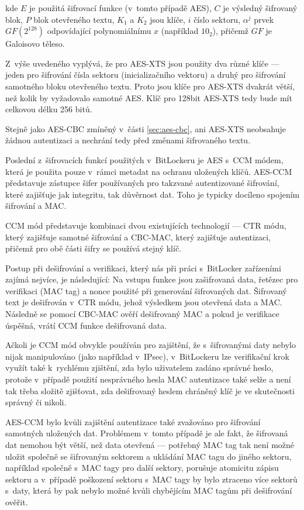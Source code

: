 kde $E$ je použitá šifrovací funkce (v~tomto případě AES), $C$ je výsledný šifrovaný blok, $P$ blok otevřeného textu, $K_1$ a $K_2$ jsou klíče, $i$ číslo sektoru, $\alpha^j$ prvek $GF(2^{128})$ odpovídající polynomiálnímu $x$ (například $10_2$), přičemž $GF$ je Galoisovo těleso.\cite{IEEE2008}

Z~výše uvedeného vyplývá, že pro AES-XTS jsou použity dva různé klíče --- jeden pro šifrování čísla sektoru (inicializačního vektoru) a druhý pro šifrování samotného bloku otevřeného textu. Proto jsou klíče pro AES-XTS dvakrát větší, než kolik by vyžadovalo samotné AES. Klíč pro 128bit AES-XTS tedy bude mít celkovou délku 256 bitů.

Stejně jako AES-CBC zmíněný v~části \ref{sec:aes-cbc}, ani AES-XTS neobsahuje žádnou autentizaci a nechrání tedy před změnami šifrovaného textu.


Poslední z~šifrovacích funkcí použitých v~BitLockeru je AES s~CCM módem, která je použita pouze v~rámci metadat na ochranu uložených klíčů. AES-CCM představuje zástupce šifer používaných pro takzvané autentizované šifrování, které zajišťuje jak integritu, tak důvěrnost dat. Toho je typicky docíleno spojením šifrování a MAC.\cite{ISO2009}

CCM mód představuje kombinaci dvou existujících technologií --- CTR módu, který zajišťuje samotné šifrování a CBC-MAC, který zajišťuje autentizaci, přičemž pro obě části šifry se používá stejný klíč.

Postup při dešifrování a verifikaci, který nás při práci s~BitLocker zařízeními zajímá nejvíce, je následující: Na vstupu funkce jsou zašifrovaná data, řetězec pro ve\-ri\-fi\-ka\-ci (MAC tag) a nonce použité při generování šifrovaných dat. Šifrovaný text je dešifrován v~CTR módu, jehož výsledkem jsou otevřená data a MAC. Následně se pomocí CBC-MAC ověří dešifrovaný MAC a pokud je verifikace úspěšná, vrátí CCM funkce dešifrovaná data.\cite{Dworkin2004}

Ačkoli je CCM mód obvykle používán pro zajištění, že s~šifrovanými daty nebylo nijak manipulováno (jako například v~IPsec\cite{Housley2005}), v~BitLockeru lze verifikační krok využít také k~rychlému zjištění, zda bylo uživatelem zadáno správné heslo, protože v~případě použití nesprávného hesla MAC autentizace také selže a není tak třeba složitě zjišťovat, zda dešifrovaný heslem chráněný klíč je ve skutečnosti správný či nikoli.

AES-CCM bylo kvůli zajištění autentizace také zvažováno pro šifrování samotných uložených dat. Problémem v~tomto případě je ale fakt, že šifrovaná dat nemohou být větší, než data otevřená --- potřebný MAC tag tak není možné uložit společně se šifrovaným sektorem a ukládání MAC tagu do jiného sektoru, například společně s~MAC tagy pro další sektory, porušuje atomicitu zápisu sektoru a v~případě poškození sektoru s~MAC tagy by bylo ztraceno více sektorů s~daty, která by pak nebylo možné kvůli chybějícím MAC tagům při dešifrování ověřit.\cite{Ferguson2006}

